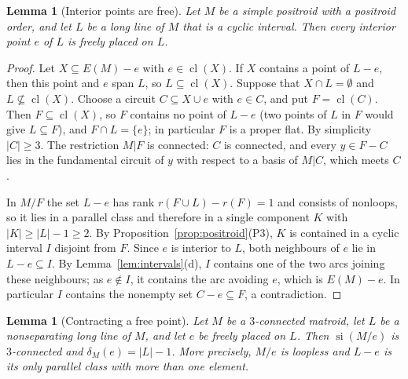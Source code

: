 \documentclass[11pt]{amsart}
\newtheorem{lemma}[theorem]{Lemma}
\theoremstyle{definition}
\theoremstyle{remark}
\numberwithin{equation}{section}
\newcommand{\cl}{\operatorname{cl}}
\newcommand{\si}{\operatorname{si}}
\begin{document}
\begin{lemma}[Interior points are free]\label{lem:interiorfree}
Let $M$ be a simple positroid with a positroid order, and let $L$ be a long line of $M$ that is a cyclic interval. Then every interior point $e$ of $L$ is freely placed on $L$.
\end{lemma}

\begin{proof}
Let $X\subseteq E(M)-e$ with $e\in\cl(X)$. If $X$ contains a point of $L-e$, then this point and $e$ span $L$, so $L\subseteq\cl(X)$. Suppose that $X\cap L=\emptyset$ and $L\not\subseteq\cl(X)$. Choose a circuit $C\subseteq X\cup e$ with $e\in C$, and put $F=\cl(C)$. Then $F\subseteq\cl(X)$, so $F$ contains no point of $L-e$ (two points of $L$ in $F$ would give $L\subseteq F$), and $F\cap L=\{e\}$; in particular $F$ is a proper flat. By simplicity $|C|\ge3$. The restriction $M|F$ is connected: $C$ is connected, and every $y\in F-C$ lies in the fundamental circuit of $y$ with respect to a basis of $M|C$, which meets $C$.

In $M/F$ the set $L-e$ has rank $r(F\cup L)-r(F)=1$ and consists of nonloops, so it lies in a parallel class and therefore in a single component $K$ with $|K|\ge|L|-1\ge2$. By Proposition~\ref{prop:positroid}(P3), $K$ is contained in a cyclic interval $I$ disjoint from $F$. Since $e$ is interior to $L$, both neighbours of $e$ lie in $L-e\subseteq I$. By Lemma~\ref{lem:intervals}(d), $I$ contains one of the two arcs joining these neighbours; as $e\notin I$, it contains the arc avoiding $e$, which is $E(M)-e$. In particular $I$ contains the nonempty set $C-e\subseteq F$, a contradiction.
\end{proof}

\begin{lemma}[Contracting a free point]\label{lem:freecontract}
Let $M$ be a $3$-connected matroid, let $L$ be a nonseparating long line of $M$, and let $e$ be freely placed on $L$. Then $\si(M/e)$ is $3$-connected and $\delta_M(e)=|L|-1$. More precisely, $M/e$ is loopless and $L-e$ is its only parallel class with more than one element.
\end{lemma}
\end{document}
